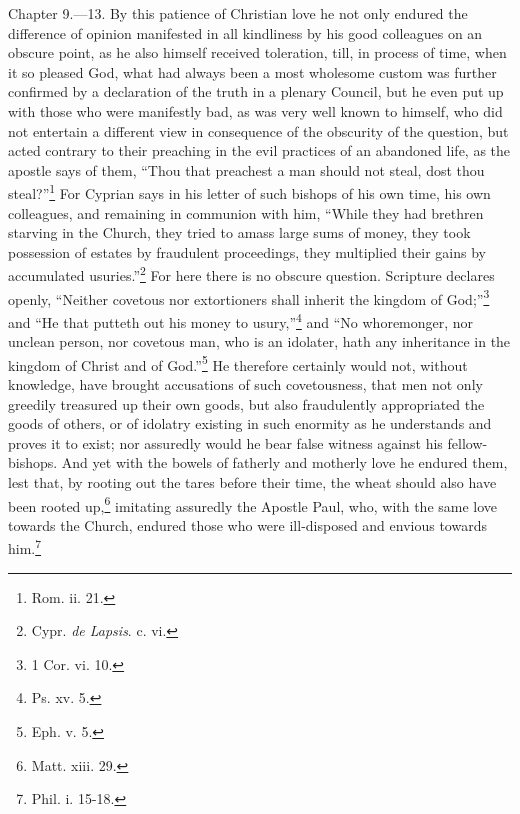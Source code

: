 Chapter 9.—13. By this patience of Christian love he not only endured the difference of opinion manifested in all kindliness by his good colleagues on an obscure point, as he also himself received toleration, till, in process of time, when it so pleased God, what had always been a most wholesome custom was further confirmed by a declaration of the truth in a plenary Council, but he even put up with those who were manifestly bad, as was very well known to himself, who did not entertain a different view in consequence of the obscurity of the question, but acted contrary to their preaching in the evil practices of an abandoned life, as the apostle says of them, ``Thou that preachest a man should not steal, dost thou steal?''\footnote{\par  Rom. ii. 21.} For Cyprian says in his letter of such bishops of his own time, his own colleagues, and remaining in communion with him, ``While they had brethren starving in the Church, they tried to amass large sums of money, they took possession of estates by fraudulent proceedings, they multiplied their gains by accumulated usuries.''\footnote{\par  Cypr. \emph{de Lapsis}. c. vi.} For here there is no obscure question. Scripture declares openly, ``Neither covetous nor extortioners shall inherit the kingdom of God;''\footnote{\par  1 Cor. vi. 10.} and ``He that putteth out his money to usury,''\footnote{\par  Ps. xv. 5.} and ``No whoremonger, nor unclean person, nor covetous man, who is an idolater, hath any inheritance in the kingdom of Christ and of God.''\footnote{\par  Eph. v. 5.} He therefore certainly would not, without knowledge, have brought accusations of such covetousness, that men not only greedily treasured up their own goods, but also fraudulently appropriated the goods of others, or of idolatry existing in such enormity as he understands and proves it to exist; nor assuredly would he bear false witness against his fellow-bishops. And yet with the bowels of fatherly and motherly love he endured them, lest that, by rooting out the tares before their time, the wheat should also have been rooted up,\footnote{\par  Matt. xiii. 29.} imitating assuredly the Apostle Paul, who, with the same love towards the Church, endured those who were ill-disposed and envious towards him.\footnote{\par  Phil. i. 15-18.}


